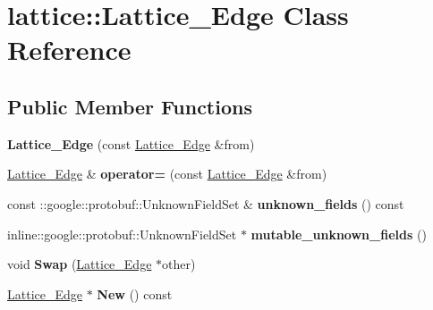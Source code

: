\hypertarget{classlattice_1_1Lattice__Edge}{
\section{lattice::Lattice\_\-Edge Class Reference}
\label{classlattice_1_1Lattice__Edge}
}
\subsection*{Public Member Functions}
\begin{DoxyCompactItemize}
\item 
\hypertarget{classlattice_1_1Lattice__Edge_acd52c069d2b4ccd5e35415ced12a8de3}{
{\bfseries Lattice\_\-Edge} (const \hyperlink{classlattice_1_1Lattice__Edge}{Lattice\_\-Edge} \&from)}
\label{classlattice_1_1Lattice__Edge_acd52c069d2b4ccd5e35415ced12a8de3}

\item 
\hypertarget{classlattice_1_1Lattice__Edge_a7b8481bf7bbecf282e2f938ff35da177}{
\hyperlink{classlattice_1_1Lattice__Edge}{Lattice\_\-Edge} \& {\bfseries operator=} (const \hyperlink{classlattice_1_1Lattice__Edge}{Lattice\_\-Edge} \&from)}
\label{classlattice_1_1Lattice__Edge_a7b8481bf7bbecf282e2f938ff35da177}

\item 
\hypertarget{classlattice_1_1Lattice__Edge_af44f15fd53ae86dd482f86e74bf4ce55}{
const ::google::protobuf::UnknownFieldSet \& {\bfseries unknown\_\-fields} () const }
\label{classlattice_1_1Lattice__Edge_af44f15fd53ae86dd482f86e74bf4ce55}

\item 
\hypertarget{classlattice_1_1Lattice__Edge_aae27de06c0aa0d1cdae07ba720e7eb7c}{
inline::google::protobuf::UnknownFieldSet $\ast$ {\bfseries mutable\_\-unknown\_\-fields} ()}
\label{classlattice_1_1Lattice__Edge_aae27de06c0aa0d1cdae07ba720e7eb7c}

\item 
\hypertarget{classlattice_1_1Lattice__Edge_aaaa95dd26cb8b36f35652fba54be5679}{
void {\bfseries Swap} (\hyperlink{classlattice_1_1Lattice__Edge}{Lattice\_\-Edge} $\ast$other)}
\label{classlattice_1_1Lattice__Edge_aaaa95dd26cb8b36f35652fba54be5679}

\item 
\hypertarget{classlattice_1_1Lattice__Edge_a499e153dc35d1496be7a0420c5f848f3}{
\hyperlink{classlattice_1_1Lattice__Edge}{Lattice\_\-Edge} $\ast$ {\bfseries New} () const }
\label{classlattice_1_1Lattice__Edge_a499e153dc35d1496be7a0420c5f848f3}


\end{DoxyCompactItemize}

